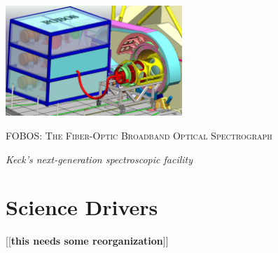 \documentclass[oneside,11pt]{amsart}
\newcommand{\comment}[2][todo]{{\color{#1}[[{\bf #2}]]}}
\begin{document}


\vspace*{-1.5cm}

\centerline{\includegraphics[width=0.5\textwidth]{figs/FOBOS_inst_v2.pdf}}
\centerline{\textsc {\Large FOBOS: The Fiber-Optic Broadband Optical Spectrograph}}
\smallskip
\centerline{\large\it Keck's next-generation spectroscopic facility}




\section{Science Drivers}
\label{sec:goals}

\comment{this needs some reorganization}

















\newpage



\setcounter{page}{1}


\end{document}
